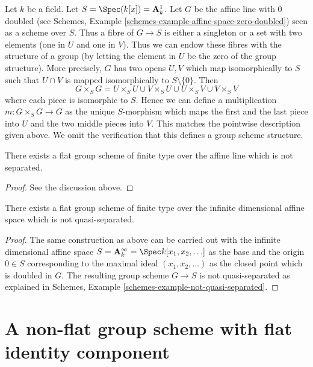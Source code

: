 \medskip\noindent
Let $k$ be a field. Let $S = \Spec(k[x]) = \mathbf{A}^1_k$.
Let $G$ be the affine line with $0$ doubled (see
Schemes, Example \ref{schemes-example-affine-space-zero-doubled})
seen as a scheme over $S$. Thus a fibre of $G \to S$ is either a
singleton or a set with two elements (one in $U$ and one in $V$).
Thus we can endow these fibres with the structure of a group (by
letting the element in $U$ be the zero of the group structure).
More precisely, $G$ has two opens $U, V$ which map isomorphically
to $S$ such that $U \cap V$ is mapped isomorphically to
$S \setminus \{0\}$. Then
$$
G \times_S G = U \times_S U \cup V \times_S U \cup
U \times_S V \cup V \times_S V
$$
where each piece is isomorphic to $S$. Hence we can define a multiplication
$m : G \times_S G \to G$ as the unique $S$-morphism which maps the first
and the last piece into $U$ and the two middle pieces into $V$. This matches
the pointwise description given above. We omit the
verification that this defines a group scheme structure.

\begin{lemma}
\label{lemma-non-separated-group-scheme}
There exists a flat group scheme of finite type over the affine line
which is not separated.
\end{lemma}

\begin{proof}
See the discussion above.
\end{proof}

\begin{lemma}
\label{lemma-non-quasi-separated-group-scheme}
There exists a flat group scheme of finite type over the infinite
dimensional affine space which is not quasi-separated.
\end{lemma}

\begin{proof}
The same construction as above can be carried out with the infinite dimensional
affine space $S = \mathbf{A}^\infty_k = \Spec k[x_1, x_2, \ldots]$ as the base
and the origin $0 \in S$ corresponding to the maximal ideal
$(x_1, x_2, \ldots)$ as the closed point which is doubled in $G$.
The resulting group scheme $G \rightarrow S$ is 
not quasi-separated as explained in
Schemes, Example \ref{schemes-example-not-quasi-separated}. 
\end{proof}



\section{A non-flat group scheme with flat identity component}
\label{section-non-flat-group-scheme}

